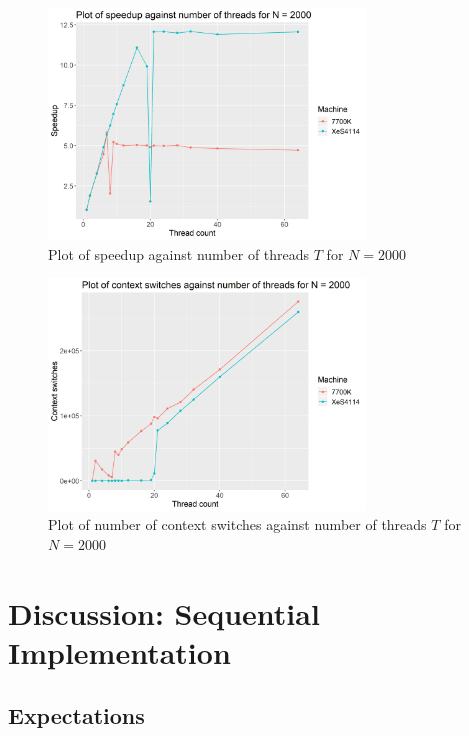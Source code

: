 \documentclass[12pt]{article}
\begin{document}
\begin{figure}[H]
    \centering
    \includegraphics[width=0.75\textwidth]{./processedResults/par-2000N-speedup}
    \caption{Plot of speedup against number of threads $T$ for $N = 2000$}
    \label{fig:par-2000N-speedup}
\end{figure}

\begin{figure}[H]
    \centering
    \includegraphics[width=0.75\textwidth]{./processedResults/par-2000N-contextSwitches}
    \caption{Plot of number of context switches against number of threads $T$ for $N = 2000$}
    \label{fig:par-2000N-contextSwitches}
\end{figure}

\pagebreak

\section{Discussion: Sequential Implementation}

\subsection{Expectations} \label{seq-expect}
\end{document}
